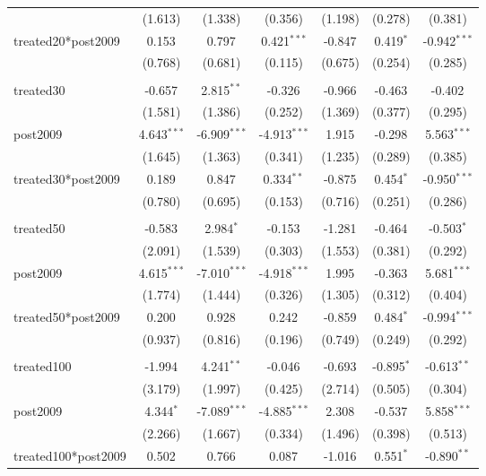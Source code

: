 \documentclass[12pt]{article}
\begin{document}
\begin{table}[!htbp]
\begin{tabular}{@{\extracolsep{5pt}}lcccccc}
  & (1.613) & (1.338) & (0.356) & (1.198) & (0.278) & (0.381) \\
 treated20*post2009 & 0.153$^{}$ & 0.797$^{}$ & 0.421$^{***}$ & -0.847$^{}$ & 0.419$^{*}$ & -0.942$^{***}$ \\
  & (0.768) & (0.681) & (0.115) & (0.675) & (0.254) & (0.285) \\
\hline \\[-1.8ex]
 treated30 & -0.657$^{}$ & 2.815$^{**}$ & -0.326$^{}$ & -0.966$^{}$ & -0.463$^{}$ & -0.402$^{}$ \\
  & (1.581) & (1.386) & (0.252) & (1.369) & (0.377) & (0.295) \\
 post2009 & 4.643$^{***}$ & -6.909$^{***}$ & -4.913$^{***}$ & 1.915$^{}$ & -0.298$^{}$ & 5.563$^{***}$ \\
  & (1.645) & (1.363) & (0.341) & (1.235) & (0.289) & (0.385) \\
 treated30*post2009 & 0.189$^{}$ & 0.847$^{}$ & 0.334$^{**}$ & -0.875$^{}$ & 0.454$^{*}$ & -0.950$^{***}$ \\
  & (0.780) & (0.695) & (0.153) & (0.716) & (0.251) & (0.286) \\
\hline \\[-1.8ex]
 treated50 & -0.583$^{}$ & 2.984$^{*}$ & -0.153$^{}$ & -1.281$^{}$ & -0.464$^{}$ & -0.503$^{*}$ \\
  & (2.091) & (1.539) & (0.303) & (1.553) & (0.381) & (0.292) \\
 post2009 & 4.615$^{***}$ & -7.010$^{***}$ & -4.918$^{***}$ & 1.995$^{}$ & -0.363$^{}$ & 5.681$^{***}$ \\
  & (1.774) & (1.444) & (0.326) & (1.305) & (0.312) & (0.404) \\
 treated50*post2009 & 0.200$^{}$ & 0.928$^{}$ & 0.242$^{}$ & -0.859$^{}$ & 0.484$^{*}$ & -0.994$^{***}$ \\
  & (0.937) & (0.816) & (0.196) & (0.749) & (0.249) & (0.292) \\
\hline \\[-1.8ex]
 treated100 & -1.994$^{}$ & 4.241$^{**}$ & -0.046$^{}$ & -0.693$^{}$ & -0.895$^{*}$ & -0.613$^{**}$ \\
  & (3.179) & (1.997) & (0.425) & (2.714) & (0.505) & (0.304) \\
 post2009 & 4.344$^{*}$ & -7.089$^{***}$ & -4.885$^{***}$ & 2.308$^{}$ & -0.537$^{}$ & 5.858$^{***}$ \\
  & (2.266) & (1.667) & (0.334) & (1.496) & (0.398) & (0.513) \\
 treated100*post2009 & 0.502$^{}$ & 0.766$^{}$ & 0.087$^{}$ & -1.016$^{}$ & 0.551$^{*}$ & -0.890$^{**}$ \\

\end{tabular}
\end{table}
\end{document}
